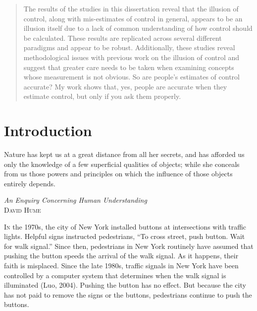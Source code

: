 \documentclass[USenglish,letterpaper,12pt,extrafontsizes,oneside,onecolumn,final]{memoir}
\begin{document}
\begin{abstract}
The results of the studies in this dissertation reveal that the illusion of control, along with mis-estimates of control in general, appears to be an illusion itself due to a lack of common understanding of how control should be calculated. These results are replicated across several different paradigms and appear to be robust.  Additionally, these studies reveal methodological issues with previous work on the illusion of control and suggest that greater care needs to be taken when examining concepts whose measurement is not obvious. So are people's estimates of control accurate? My work shows that, yes, people are accurate when they estimate control, but only if you ask them properly.
\end{abstract}
\clearpage

\tableofcontents*
\clearpage

\mainmatter
\chapter{Introduction}
\label{chap:intro}

\setlength{\epigraphwidth}{18em}
\epigraphfontsize{\footnotesize}

\epigraph{\SingleSpacing Nature has kept us at a great distance from all her secrets, and has afforded us only the knowledge of a few superficial qualities of objects; while she conceals from us those powers and principles on which the influence of those objects entirely depends.}{\textit{An Enquiry Concerning Human Understanding}\\ \textsc{David Hume}}

\lettrine[lines=2,slope=-3pt,nindent=2pt]{I}{n} the 1970s, the city of New York installed buttons at intersections with traffic lights. Helpful signs instructed pedestrians, ``To cross street, push button. Wait for walk signal.'' Since then, pedestrians in New York routinely have assumed that pushing the button speeds the arrival of the walk signal. As it happens, their faith is misplaced. Since the late 1980s, traffic signals in New York have been controlled by a computer system that determines when the walk signal is illuminated (Luo, 2004). Pushing the button has no effect. But because the city has not paid to remove the signs or the buttons, pedestrians continue to push the buttons. 
\end{document}
